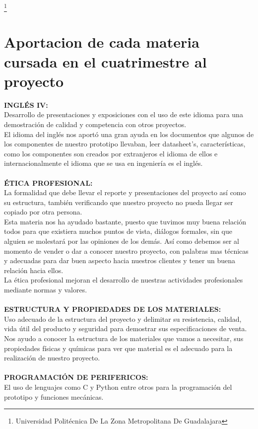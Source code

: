 \documentclass[11pt,a4paper]{article}
\begin{document}
 \footnote{Universidad Politécnica De La Zona Metropolitana De Guadalajara} 
\newpage

\section{Aportacion de cada materia cursada en el cuatrimestre al proyecto}
\textbf{INGLÉS IV:}\\ Desarrollo de presentaciones y exposiciones con el uso de este idioma para una demostración de calidad y competencia con otros proyectos.\\
El idioma del inglés nos aportó una gran ayuda en los documentos que algunos de los componentes de nuestro prototipo llevaban, leer datasheet's, características,  como los componentes son creados por extranjeros el idioma de ellos e internacionalmente el idioma que se usa en ingeniería es el inglés.\\\\
\textbf{ÉTICA PROFESIONAL:}\\ La formalidad que debe llevar el reporte y presentaciones del proyecto así como su estructura, también verificando que nuestro proyecto no pueda llegar ser copiado por otra persona.\\
Esta materia nos ha ayudado bastante, puesto que tuvimos muy buena relación todos para que existiera muchos puntos de vista, diálogos formales, sin que alguien se molestará por las opiniones de los demás. Así como debemos ser al momento de vender o dar a conocer nuestro proyecto, con palabras mas técnicas y adecuadas para dar buen aspecto hacia nuestros clientes y tener un buena relación hacia ellos.\\
La ética profesional mejoran el desarrollo de nuestras actividades profesionales mediante normas y valores.\\\\
\textbf{ESTRUCTURA Y PROPIEDADES DE LOS MATERIALES:}\\ Uso adecuado de la estructura del proyecto y delimitar su resistencia, calidad, vida útil del producto y seguridad para demostrar sus especificaciones de venta.\\
Nos ayudo a conocer la estructura de los materiales que vamos a necesitar, sus propiedades físicas y químicas para ver que material es el adecuado para la realización de nuestro proyecto. \\\\
\textbf{PROGRAMACIÓN DE PERIFERICOS:}\\ El uso de lenguajes como C y Python entre otros para la programación del prototipo y funciones mecánicas.\\
\end{document}

